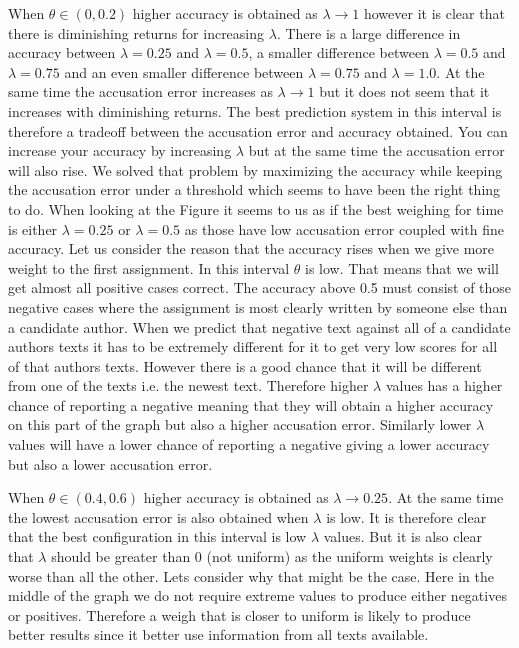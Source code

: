 \begin{description}
        When $\theta \in (0, 0.2)$ higher accuracy is obtained as $\lambda
        \rightarrow 1$ however it is clear that there is diminishing returns
        for increasing $\lambda$. There is a large difference in accuracy
        between $\lambda = 0.25$ and $\lambda = 0.5$, a smaller difference
        between $\lambda = 0.5$ and $\lambda = 0.75$ and an even smaller
        difference between $\lambda = 0.75$ and $\lambda = 1.0$. At the same
        time the accusation error increases as $\lambda \rightarrow 1$ but it
        does not seem that it increases with diminishing returns. The best
        prediction system in this interval is therefore a tradeoff between the
        accusation error and accuracy obtained. You can increase your accuracy
        by increasing $\lambda$ but at the same time the accusation error will
        also rise. We solved that problem by maximizing the accuracy while
        keeping the accusation error under a threshold which seems to have been
        the right thing to do. When looking at the Figure it seems to us as if
        the best weighing for time is either $\lambda = 0.25$ or $\lambda = 0.5$
        as those have low accusation error coupled with fine accuracy. Let us
        consider the reason that the accuracy rises when we give more weight
        to the first assignment. In this interval $\theta$ is low. That means
        that we will get almost all positive cases correct. The accuracy above
        0.5 must consist of those negative cases where the assignment is most
        clearly written by someone else than a candidate author. When we predict
        that negative text against all of a candidate authors texts it has to
        be extremely different for it to get very low scores for all of that
        authors texts. However there is a good chance that it will be different
        from one of the texts i.e. the newest text. Therefore higher $\lambda$
        values has a higher chance of reporting a negative meaning that they
        will obtain a higher accuracy on this part of the graph but also a
        higher accusation error. Similarly lower $\lambda$ values will have a
        lower chance of reporting a negative giving a lower accuracy but also a
        lower accusation error.

        When $\theta \in (0.4, 0.6)$ higher accuracy is obtained as $\lambda
        \rightarrow 0.25$. At the same time the lowest accusation error is
        also obtained when $\lambda$ is low. It is therefore clear that the
        best configuration in this interval is low $\lambda$ values. But it is
        also clear that $\lambda$ should be greater than 0 (not uniform) as
        the uniform weights is clearly worse than all the other. Lets consider
        why that might be the case. Here in the middle of the graph we do
        not require extreme values to produce either negatives or positives.
        Therefore a weigh that is closer to uniform is likely to produce better
        results since it better use information from all texts available.


\end{description}
